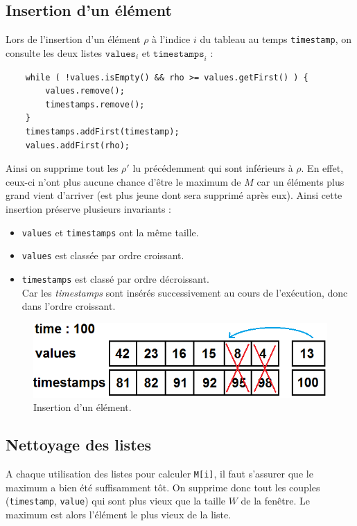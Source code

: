 \documentclass[12pt,a4paper,titlepage]{article}
\newcommand{\class}[1]{\texttt{#1}}
\begin{document}
\subsection{Insertion d'un élément}
Lors de l'insertion d'un élément $\rho$ à l'indice $i$ du tableau au temps \class{timestamp}, on consulte les deux listes $\class{values}_i$ et $\class{timestamps}_i$ :
\begin{lstlisting}
    while ( !values.isEmpty() && rho >= values.getFirst() ) {
    	values.remove();
    	timestamps.remove();
    }
    timestamps.addFirst(timestamp);
	values.addFirst(rho);
\end{lstlisting}
Ainsi on supprime tout les $\rho'$ lu précédemment qui sont inférieurs à $\rho$. En effet, ceux-ci n'ont plus aucune chance d'être le maximum de $M$ car un éléments plus grand vient d'arriver (est plus jeune dont sera supprimé après eux).
Ainsi cette insertion préserve plusieurs invariants :
\begin{itemize}
\item \class{values} et \class{timestamps} ont la même taille.
\item \class{values} est classée par ordre croissant.
\item \class{timestamps} est classé par ordre décroissant.\\
Car les \textit{timestamps} sont insérés successivement au cours de l'exécution, donc dans l'ordre croissant.
\end{itemize}

\begin{figure}[!h]
	\centering
	\includegraphics[scale=0.5]{pictures/picSlidingWindow2.png}
	\caption{Insertion d'un élément.}
\end{figure}

\newpage
\subsection{Nettoyage des listes}
A chaque utilisation des listes pour calculer \class{M[i]}, il faut s'assurer que le maximum a bien été suffisamment tôt. On supprime donc tout les couples (\class{timestamp}, \class{value}) qui sont plus vieux que la taille $W$ de la fenêtre. Le maximum est alors l'élément le plus vieux de la liste.
\end{document}

